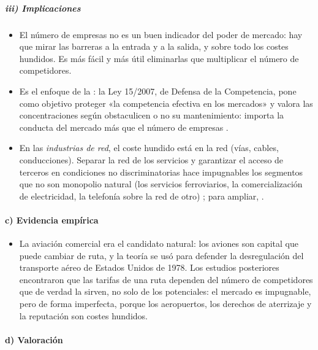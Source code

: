 \documentclass[11pt]{article}
\begin{document}
\subparagraph{iii) Implicaciones}

\begin{itemize}
\item El número de empresas no es un buen indicador del poder de mercado: hay que mirar las barreras a la entrada y a la salida, y sobre todo los costes hundidos. Es más fácil y más útil eliminarlas que multiplicar el número de competidores.
\item Es el enfoque de la : la Ley 15/2007, de Defensa de la Competencia, pone como objetivo proteger «la competencia efectiva en los mercados» y valora las concentraciones según obstaculicen o no su mantenimiento\nocite{BOE2007LDC}: importa la conducta del mercado más que el número de empresas .
\item En las \emph{industrias de red}, el coste hundido está en la red (vías, cables, conducciones). Separar la red de los servicios y garantizar el acceso de terceros en condiciones no discriminatorias hace impugnables los segmentos que no son monopolio natural (los servicios ferroviarios, la comercialización de electricidad, la telefonía sobre la red de otro) ; para ampliar, .
\end{itemize}

\paragraph{c) Evidencia empírica}

\begin{itemize}
\item La aviación comercial era el candidato natural: los aviones son capital que puede cambiar de ruta, y la teoría se usó para defender la desregulación del transporte aéreo de Estados Unidos de 1978\nocite{BaileyPanzar1981Contestability,BaileyBaumol1984Deregulation}. Los estudios posteriores encontraron que las tarifas de una ruta dependen del número de competidores que de verdad la sirven, no solo de los potenciales: el mercado es impugnable, pero de forma imperfecta, porque los aeropuertos, los derechos de aterrizaje y la reputación son costes hundidos\nocite{MorrisonWinston1987Empirical}.
\end{itemize}

\paragraph{d) Valoración}
\end{document}
